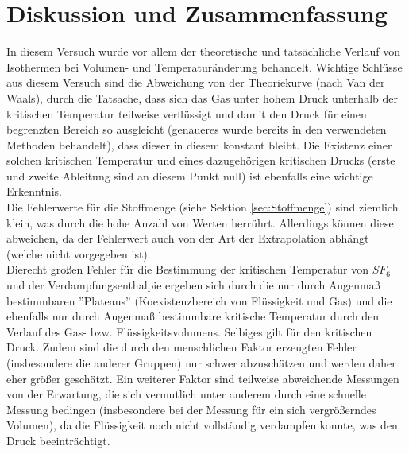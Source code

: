 \section{Diskussion und Zusammenfassung}
In diesem Versuch wurde vor allem der theoretische und tatsächliche Verlauf von Isothermen bei Volumen- und Temperaturänderung behandelt. Wichtige Schlüsse aus diesem Versuch sind die Abweichung von der Theoriekurve (nach Van der Waals), durch die Tatsache, dass sich das Gas unter hohem Druck unterhalb der kritischen Temperatur teilweise verflüssigt und damit den Druck für einen begrenzten Bereich so ausgleicht (genaueres wurde bereits in den verwendeten Methoden behandelt), dass dieser in diesem konstant bleibt. Die Existenz einer solchen kritischen Temperatur und eines dazugehörigen kritischen Drucks (erste und zweite Ableitung sind an diesem Punkt null) ist ebenfalls eine wichtige Erkenntnis.\\
Die Fehlerwerte für die Stoffmenge (siehe Sektion \ref{sec:Stoffmenge}) sind ziemlich klein, was durch die hohe Anzahl von Werten herrührt. Allerdings können diese abweichen, da der Fehlerwert auch von der Art der Extrapolation abhängt (welche nicht vorgegeben ist).\\
Dierecht großen Fehler für die Bestimmung der kritischen Temperatur von $SF_6$ und der Verdampfungsenthalpie ergeben sich durch die nur durch Augenmaß bestimmbaren ''Plateaus'' (Koexistenzbereich von Flüssigkeit und Gas) und die ebenfalls nur durch Augenmaß bestimmbare kritische Temperatur durch den Verlauf des Gas- bzw. Flüssigkeitsvolumens. Selbiges gilt für den kritischen Druck. Zudem sind die durch den menschlichen Faktor erzeugten Fehler (insbesondere die anderer Gruppen) nur schwer abzuschätzen und werden daher eher größer geschätzt. Ein weiterer Faktor sind teilweise abweichende Messungen von der Erwartung, die sich vermutlich unter anderem durch eine schnelle Messung bedingen (insbesondere bei der Messung für ein sich vergrößerndes Volumen), da die Flüssigkeit noch nicht vollständig verdampfen konnte, was den Druck beeinträchtigt.